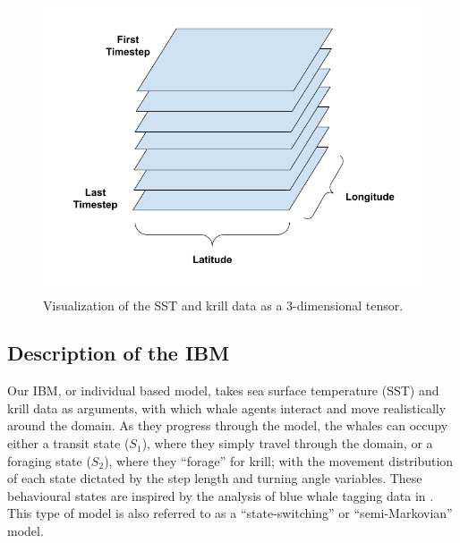 \documentclass[11pt]{article}
\begin{document}
\begin{figure}[ht] \centering
    \includegraphics[width=6in]{matrixvis.png}
    \caption{Visualization of the SST and krill data as a 3-dimensional tensor.}
    \label{fig:matrix}
\end{figure}

\subsection{Description of the IBM}
Our IBM, or individual based model, takes sea surface temperature (SST) and krill data as arguments, with which whale agents interact and move realistically around the domain. As they progress through the model, the whales can occupy either a transit state ($S_1$), where they simply travel through the domain, or a foraging state ($S_2$), where they “forage” for krill; with the movement distribution of each state dictated by the step length and turning angle variables. These behavioural states are inspired by the analysis of blue whale tagging data in \cite{Bailey}. This type of model is also referred to as a “state-switching” or “semi-Markovian” model. \par
\end{document}
